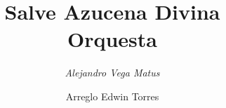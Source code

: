 \documentclass[letterpaper]{report}
\title{ \textbf{ \Huge Salve Azucena Divina  } \\ { \Huge Orquesta } }
\author{ \textit{ \huge Alejandro Vega Matus } }
\date{ \LARGE Arreglo Edwin Torres }
\begin{document}
    
    \maketitle
     
    \begin{landscape}
        {%
\parindent 0pt
\noindent
\ifx\preLilyPondExample \undefined
\else
  \expandafter\preLilyPondExample
\fi
\def\lilypondbook{}%

\ifx\postLilyPondExample \undefined
\else
  \expandafter\postLilyPondExample
\fi
}    
    \end{landscape}
    
    {%
\parindent 0pt
\noindent
\ifx\preLilyPondExample \undefined
\else
  \expandafter\preLilyPondExample
\fi
\def\lilypondbook{}%

\ifx\postLilyPondExample \undefined
\else
  \expandafter\postLilyPondExample
\fi
}
    \clearpage
    
\end{document}
